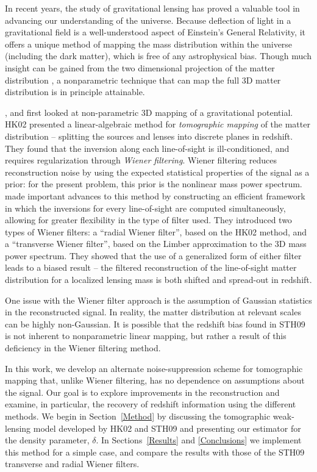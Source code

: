 \documentclass[twocolumn]{emulateapj}
\begin{document}
In recent years, the study of gravitational lensing has proved a
valuable tool in advancing our understanding of the universe.  Because
deflection of light in a gravitational field is a well-understood
aspect of Einstein's General Relativity, it offers a unique method of
mapping the mass distribution within the universe (including the dark
matter), which is free of any astrophysical bias.  Though much insight
can be gained from the two dimensional projection of the matter distribution
\citep[see, e.g.][]{Clowe06}, a nonparametric technique that can map
the full 3D matter distribution is in principle attainable. 

\citet{Taylor01}, \citet[][hereafter HK02]{Hu02} and 
\citet{Bacon03} first looked at
non-parametric 3D mapping of a gravitational potential.  HK02
presented a linear-algebraic method for \textit{tomographic mapping}
of the matter distribution -- splitting the sources and lenses into
discrete planes in redshift.  They found that the inversion along each
line-of-sight is ill-conditioned, and requires regularization through 
\textit{Wiener filtering}.  Wiener filtering reduces reconstruction noise
by using the expected statistical properties of the signal as a prior: 
for the present problem, this prior is the nonlinear mass power spectrum.  
\citet[][hereafter STH09]{Simon09}
made important advances to this method by constructing an efficient
framework in which the inversions for every line-of-sight are computed
simultaneously, allowing for greater flexibility in the
type of filter used.  They introduced two types of Wiener filters: 
a ``radial Wiener filter'', based on the HK02 method, 
and a ``transverse Wiener filter'', 
based on the Limber approximation to
the 3D mass power spectrum.
They showed that the use of a generalized form of either
filter leads to a biased result -- the filtered reconstruction of the
line-of-sight matter distribution for a localized lensing mass is both
shifted and spread-out in redshift.

One issue with the Wiener filter approach is the assumption of
Gaussian statistics in the reconstructed signal.  In reality, the matter 
distribution at relevant scales can be highly non-Gaussian.  
It is possible that the redshift bias found in STH09 is not inherent
to nonparametric linear mapping, but rather a result of this deficiency
in the Wiener filtering method.

In this work, we develop an alternate noise-suppression scheme for
tomographic mapping that,  unlike Wiener filtering, has no dependence
on assumptions about the signal.   Our goal is to explore improvements
in the reconstruction and examine, in particular, the recovery of
redshift information using the different methods. We begin in 
Section~\ref{Method} 
by discussing the tomographic weak-lensing model developed by HK02
and STH09 and presenting our estimator for the density parameter, $\delta$.  
In Sections~\ref{Results} and \ref{Conclusions} we implement this method
for a simple case, and compare the results with those of the STH09 transverse
and radial Wiener filters.
\end{document}
